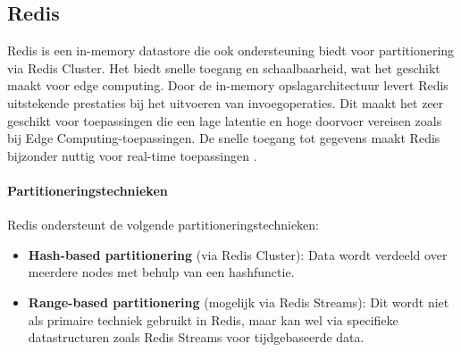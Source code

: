 \subsection{Redis}

Redis is een in-memory datastore die ook ondersteuning biedt voor partitionering via Redis Cluster. Het biedt snelle toegang en schaalbaarheid, wat het geschikt maakt voor edge computing. Door de in-memory opslagarchitectuur levert Redis uitstekende prestaties bij het uitvoeren van invoegoperaties. Dit maakt het zeer geschikt voor toepassingen die een lage latentie en hoge doorvoer vereisen zoals bij Edge Computing-toepassingen. De snelle toegang tot gegevens maakt Redis bijzonder nuttig voor real-time toepassingen \autocite{RedisDocumentation}.

\paragraph{Partitioneringstechnieken}  
Redis ondersteunt de volgende partitioneringstechnieken:
\begin{itemize}
    \item \textbf{Hash-based partitionering} (via Redis Cluster): Data wordt verdeeld over meerdere nodes met behulp van een hashfunctie.
    \item \textbf{Range-based partitionering} (mogelijk via Redis Streams): Dit wordt niet als primaire techniek gebruikt in Redis, maar kan wel via specifieke datastructuren zoals Redis Streams voor tijdgebaseerde data.
\end{itemize}

\begin{table}[h]
    \centering
    \caption{Overzicht van de specificaties van Redis. \cite{RedisDocumentation}}
\end{table}

